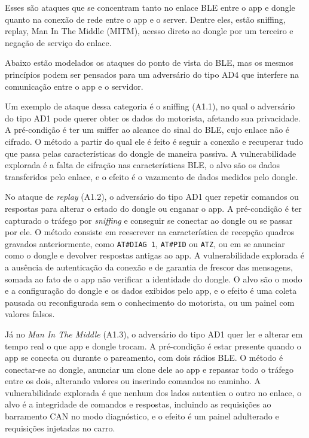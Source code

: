 \documentclass[
	12pt,
	article,			%
	oneside,
	a4paper,
	english,
	brazil				%
	]{abntex2}
\begin{document}
Esses são ataques que se concentram tanto no enlace BLE entre o app e dongle quanto na conexão de rede entre o app e o server. 
Dentre eles, estão sniffing, replay, Man In The Middle (MITM), acesso direto ao dongle por um terceiro e negação de serviço do enlace.

Abaixo estão modelados os ataques do ponto de vista do BLE, mas os mesmos princípios podem ser pensados para um adversário do tipo AD4 que interfere
na comunicação entre o app e o servidor.

Um exemplo de ataque dessa categoria é o sniffing (A1.1), no qual o adversário do tipo AD1 pode querer obter os dados do motorista, afetando sua
privacidade. A pré-condição é ter um sniffer ao alcance do sinal do BLE, cujo enlace não é cifrado. O método a partir do qual ele é feito é
seguir a conexão e recuperar tudo que passa pelas características do dongle de maneira passiva. A vulnerabilidade explorada é a falta de cifração
nas características BLE, o alvo são os dados transferidos pelo enlace, e o efeito é o vazamento de dados medidos pelo dongle.

No ataque de \textit{replay} (A1.2), o adversário do tipo AD1 quer repetir comandos ou respostas para alterar o estado do dongle ou enganar o app.
A pré-condição é ter capturado o tráfego por \textit{sniffing} e conseguir se conectar ao dongle ou se passar por ele. O método consiste em
reescrever na característica de recepção quadros gravados anteriormente, como \texttt{AT\#DIAG 1}, \texttt{AT\#PID} ou \texttt{ATZ}, ou em se
anunciar como o dongle e devolver respostas antigas ao app. A vulnerabilidade explorada é a ausência de autenticação da conexão e de
garantia de frescor das mensagens, somada ao fato de o app não verificar a identidade do dongle. O alvo são o modo e a configuração do dongle
e os dados exibidos pelo app, e o efeito é uma coleta pausada ou reconfigurada sem o conhecimento do motorista, ou um painel com valores falsos.

Já no \textit{Man In The Middle} (A1.3), o adversário do tipo AD1 quer ler e alterar em tempo real o que app e dongle trocam. A pré-condição é estar
presente quando o app se conecta ou durante o pareamento, com dois rádios BLE. O método é conectar-se ao dongle, anunciar um clone dele ao
app e repassar todo o tráfego entre os dois, alterando valores ou inserindo comandos no caminho. A vulnerabilidade explorada é que nenhum dos
lados autentica o outro no enlace, o alvo é a integridade de comandos e respostas, incluindo as requisições ao barramento CAN no modo
diagnóstico, e o efeito é um painel adulterado e requisições injetadas no carro.
\end{document}
